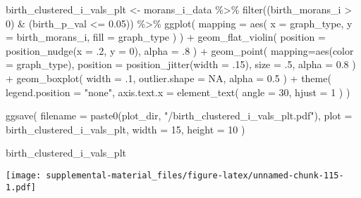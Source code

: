 \documentclass[
]{book}
\newenvironment{Shaded}{\begin{snugshade}}{\end{snugshade}}
\newcommand{\AttributeTok}[1]{\textcolor[rgb]{0.77,0.63,0.00}{#1}}
\newcommand{\ConstantTok}[1]{\textcolor[rgb]{0.00,0.00,0.00}{#1}}
\newcommand{\DecValTok}[1]{\textcolor[rgb]{0.00,0.00,0.81}{#1}}
\newcommand{\FloatTok}[1]{\textcolor[rgb]{0.00,0.00,0.81}{#1}}
\newcommand{\FunctionTok}[1]{\textcolor[rgb]{0.00,0.00,0.00}{#1}}
\newcommand{\NormalTok}[1]{#1}
\newcommand{\OtherTok}[1]{\textcolor[rgb]{0.56,0.35,0.01}{#1}}
\newcommand{\SpecialCharTok}[1]{\textcolor[rgb]{0.00,0.00,0.00}{#1}}
\newcommand{\StringTok}[1]{\textcolor[rgb]{0.31,0.60,0.02}{#1}}
\begin{document}
\begin{Shaded}
\begin{Highlighting}[]
\NormalTok{birth\_clustered\_i\_vals\_plt }\OtherTok{\textless{}{-}}\NormalTok{ morans\_i\_data }\SpecialCharTok{\%\textgreater{}\%}
  \FunctionTok{filter}\NormalTok{((birth\_morans\_i }\SpecialCharTok{\textgreater{}} \DecValTok{0}\NormalTok{) }\SpecialCharTok{\&}\NormalTok{ (birth\_p\_val }\SpecialCharTok{\textless{}=} \FloatTok{0.05}\NormalTok{)) }\SpecialCharTok{\%\textgreater{}\%}
  \FunctionTok{ggplot}\NormalTok{(}
    \AttributeTok{mapping =} \FunctionTok{aes}\NormalTok{(}
      \AttributeTok{x =}\NormalTok{ graph\_type,}
      \AttributeTok{y =}\NormalTok{ birth\_morans\_i,}
      \AttributeTok{fill =}\NormalTok{ graph\_type}
\NormalTok{    )}
\NormalTok{  ) }\SpecialCharTok{+}
  \FunctionTok{geom\_flat\_violin}\NormalTok{(}
    \AttributeTok{position =} \FunctionTok{position\_nudge}\NormalTok{(}\AttributeTok{x =}\NormalTok{ .}\DecValTok{2}\NormalTok{, }\AttributeTok{y =} \DecValTok{0}\NormalTok{),}
    \AttributeTok{alpha =}\NormalTok{ .}\DecValTok{8}
\NormalTok{  ) }\SpecialCharTok{+}
  \FunctionTok{geom\_point}\NormalTok{(}
    \AttributeTok{mapping=}\FunctionTok{aes}\NormalTok{(}\AttributeTok{color =}\NormalTok{ graph\_type),}
    \AttributeTok{position =} \FunctionTok{position\_jitter}\NormalTok{(}\AttributeTok{width =}\NormalTok{ .}\DecValTok{15}\NormalTok{),}
    \AttributeTok{size =}\NormalTok{ .}\DecValTok{5}\NormalTok{,}
    \AttributeTok{alpha =} \FloatTok{0.8}
\NormalTok{  ) }\SpecialCharTok{+}
  \FunctionTok{geom\_boxplot}\NormalTok{(}
    \AttributeTok{width =}\NormalTok{ .}\DecValTok{1}\NormalTok{,}
    \AttributeTok{outlier.shape =} \ConstantTok{NA}\NormalTok{,}
    \AttributeTok{alpha =} \FloatTok{0.5}
\NormalTok{  ) }\SpecialCharTok{+}
  \FunctionTok{theme}\NormalTok{(}
    \AttributeTok{legend.position =} \StringTok{"none"}\NormalTok{,}
    \AttributeTok{axis.text.x =} \FunctionTok{element\_text}\NormalTok{(}
      \AttributeTok{angle =} \DecValTok{30}\NormalTok{,}
      \AttributeTok{hjust =} \DecValTok{1}
\NormalTok{    )}
\NormalTok{  )}

\FunctionTok{ggsave}\NormalTok{(}
  \AttributeTok{filename =} \FunctionTok{paste0}\NormalTok{(plot\_dir, }\StringTok{"/birth\_clustered\_i\_vals\_plt.pdf"}\NormalTok{),}
  \AttributeTok{plot =}\NormalTok{ birth\_clustered\_i\_vals\_plt,}
  \AttributeTok{width =} \DecValTok{15}\NormalTok{,}
  \AttributeTok{height =} \DecValTok{10}
\NormalTok{)}

\NormalTok{birth\_clustered\_i\_vals\_plt}
\end{Highlighting}
\end{Shaded}

\texttt{[image: supplemental-material\_files/figure-latex/unnamed-chunk-115-1.pdf]}

  
\end{document}
